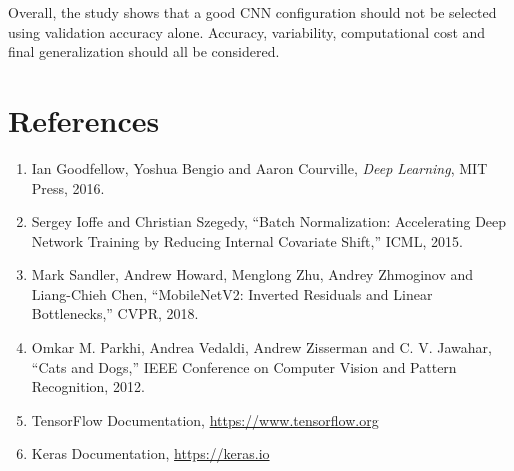 \documentclass[12pt,a4paper]{article}
\begin{document}
Overall, the study shows that a good CNN configuration should not be selected
using validation accuracy alone. Accuracy, variability, computational cost
and final generalization should all be considered.

\section{References}

\begin{enumerate}
    \item Ian Goodfellow, Yoshua Bengio and Aaron Courville,
    \textit{Deep Learning}, MIT Press, 2016.

    \item Sergey Ioffe and Christian Szegedy,
    ``Batch Normalization: Accelerating Deep Network Training by Reducing
    Internal Covariate Shift,'' ICML, 2015.

    \item Mark Sandler, Andrew Howard, Menglong Zhu, Andrey Zhmoginov and
    Liang-Chieh Chen,
    ``MobileNetV2: Inverted Residuals and Linear Bottlenecks,'' CVPR, 2018.

    \item Omkar M. Parkhi, Andrea Vedaldi, Andrew Zisserman and C. V. Jawahar,
    ``Cats and Dogs,'' IEEE Conference on Computer Vision and Pattern
    Recognition, 2012.

    \item TensorFlow Documentation,
    \url{https://www.tensorflow.org}

    \item Keras Documentation,
    \url{https://keras.io}
\end{enumerate}
\end{document}
